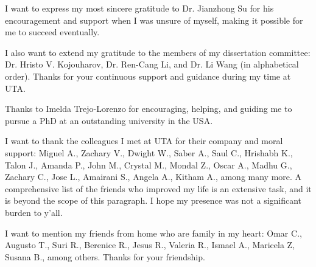 

I want to express my most sincere gratitude to Dr. Jianzhong Su for his encouragement and support when I was unsure of myself, making it possible for me to succeed eventually.

I also want to extend my gratitude to the members of my dissertation committee: Dr. Hristo V. Kojouharov, Dr. Ren-Cang Li, and Dr. Li Wang (in alphabetical order).
%
Thanks for your continuous support and guidance during my time at UTA.

Thanks to Imelda Trejo-Lorenzo for encouraging, helping, and guiding me to pursue a PhD at an outstanding university in the USA.

I want to thank the colleagues I met at UTA for their company and moral support: Miguel A., Zachary V., Dwight W., Saber A., Saul C., Hrishabh K., Talon J., Amanda P., John M., Crystal M., Mondal Z., Oscar A., Madhu G., Zachary C., Jose L., Amairani S., Angela A., Kitham A., among many more.
%
A comprehensive list of the friends who improved my life is an extensive task, and it is beyond the scope of this paragraph.
%
I hope my presence was not a significant burden to y'all.

I want to mention my friends from home who are family in my heart: Omar C., Augusto T., Suri R., Berenice R., Jesus R., Valeria R., Ismael A., 
Maricela Z, Susana B., among others.
%
Thanks for your friendship.

%
%
